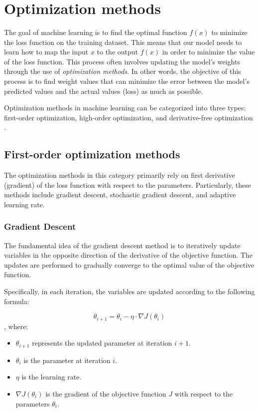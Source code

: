 \documentclass[12pt,a4paper]{article}
\author{\textit{\authorName}}
\title{\textbf{\titleName}}
\begin{document}
	\maketitle
	

\section{Optimization methods}

The goal of machine learning is to find the optimal function \(f(x)\) to minimize the loss function on the training dataset. This means that our model needs to learn how to map the input \(x\) to the output \(f(x)\) in order to minimize the value of the loss function. This process often involves updating the model's weights through the use of \textit{optimization methods}. In other words, the objective of this process is to find weight values that can minimize the error between the model's predicted values and the actual values (loss) as much as possible.

Optimization methods in machine learning can be categorized into three types: first-order optimization, high-order optimization, and derivative-free optimization \cite{optimization}.


\subsection{First-order optimization methods}
The optimization methods in this category primarily rely on first derivative (gradient) of the loss function with respect to the parameters. Particularly, these methods include gradient descent, stochastic gradient descent, and adaptive learning rate.

\subsubsection{Gradient Descent}

The fundamental idea of the gradient descent method is to iteratively update variables in the opposite direction of the derivative of the objective function. The updates are performed to gradually converge to the optimal value of the objective function.

Specifically, in each iteration, the variables are updated according to the following formula:

\begin{equation}
	\theta_{i+1} = \theta_i - \eta \cdot \nabla J(\theta_i)
\end{equation}
, where:
\begin{itemize}
	\item \(\theta_{i+1}\) represents the updated parameter at iteration \(i+1\).
	\item \(\theta_i\) is the parameter at iteration \(i\).
	\item \(\eta\) is the learning rate.
	\item \(\nabla J(\theta_i)\) is the gradient of the objective function \(J\) with respect to the parameters \(\theta_i\).
\end{itemize}
\end{document}
